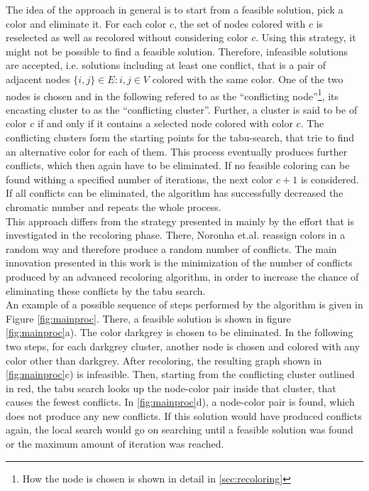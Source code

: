 The idea of the approach in general is to start from a feasible solution, pick a color and eliminate it. For each color $c$, the set of nodes colored with $c$ is reselected as well as recolored without considering color $c$. Using this strategy, it might not be possible to find a feasible solution. Therefore, infeasible solutions are accepted, i.e. solutions including at least one conflict, that is a pair of adjacent nodes $\{i,j\}\in E : i,j \in V$ colored with the same color. One of the two nodes is chosen and in the following refered to as the ``conflicting node''\footnote{How the node is chosen is shown in detail in \ref{sec:recoloring}}, its encasting cluster to as the ``conflicting cluster''. Further, a cluster is said to be of color $c$ if and only if it contains a selected node colored with color $c$. The conflicting clusters form the starting points for the tabu-search, that trie to find an alternative color for each of them. This process eventually produces further conflicts, which then again have to be eliminated. If no feasible coloring can be found withing a specified number of iterations, the next color $c+1$ is considered. If all conflicts can be eliminated, the algorithm has successfully decreased the chromatic number and repeats the whole process.\\
This approach differs from the strategy presented in \cite{noronha-06} mainly by the effort that is investigated in the recoloring phase. There, Noronha et.al. reassign colors in a random way and therefore produce a random number of conflicts. The main innovation presented in this work is the minimization of the number of conflicts produced by an advanced recoloring algorithm, in order to increase the chance of eliminating these conflicts by the tabu search.\\
An example of a possible sequence of steps performed by the algorithm is given in Figure \ref{fig:mainproc}. There, a feasible solution is shown in figure \ref{fig:mainproc}a). The color darkgrey is chosen to be eliminated. In the following two steps, for each darkgrey cluster, another node is chosen and colored with any color other than darkgrey. After recoloring, the resulting graph shown in \ref{fig:mainproc}c) is infeasible. Then, starting from the conflicting cluster outlined in red, the tabu search looks up the node-color pair inside that cluster, that causes the fewest conflicts. In \ref{fig:mainproc}d), a node-color pair is found, which does not produce any new conflicts. If this solution would have produced conflicts again, the local search would go on searching until a feasible solution was found or the maximum amount of iteration was reached.
